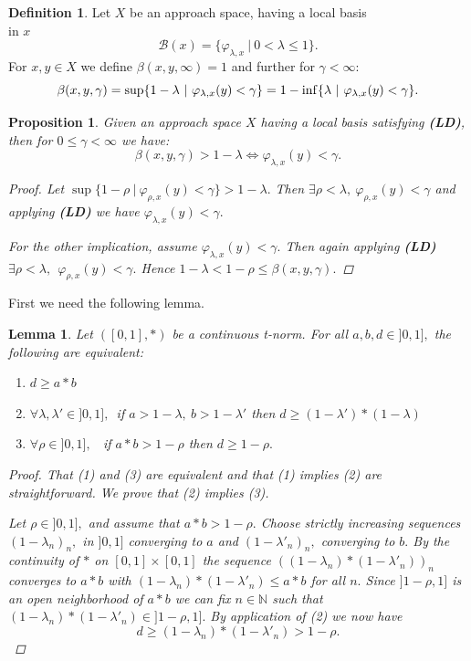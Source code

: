 \documentclass[12pt,a4paper]{amsart}
\theoremstyle{theorem}
\newtheorem{proposition}[theorem]{Proposition}
\newtheorem{lemma}[theorem]{Lemma}
\theoremstyle{definition}
\newtheorem{definition}[theorem]{Definition}
\newcommand{\bbb}{\ensuremath{\mathcal{B}}}
\newcommand{\N}{\ensuremath{\mathbb{N}}}
\renewcommand{\inf}{\myinf}
\DeclareMathOperator*{\myinf}{in\vphantom{p}f}
\renewcommand{\b}{\ensuremath{\beta}}
\renewcommand{\l}{\ensuremath{\lambda}}
\begin{document}
{\begin{definition}\label{}
Let $X$ be an approach space, having a local basis\\
 in $x$
$$
\bbb(x) = \{ \varphi_{\l,x} \ | \ 0  < \l \leq 1 \}.
$$
For $x,y \in X$ we define $\b (x,y, \infty ) = 1$ and further for $\gamma < \infty$:
\begin{equation}\label{beta}
\b(x,y,\gamma) = \sup \{1 - \l \ | \ \varphi_{\l,x} (y) < \gamma\} = 1 - \inf  \{\l \ | \ \varphi_{\l,x} (y) < \gamma\}.
\end{equation}
\end{definition}


\begin{proposition}\label{equivbeta}
Given an approach space $X$ having a local basis satisfying {\bf(LD)},
then for $0 \leq \gamma < \infty$ we have:
$$
\b(x,y,\gamma) > 1 - \l   \Leftrightarrow  \varphi_{\l,x} (y) < \gamma.
$$
\begin{proof}
Let  $\sup \{1 - \rho \ | \ \varphi_{\rho,x} (y) < \gamma\}  > 1 - \l.$ Then $\exists \rho < \l, \ \varphi_{\rho,x}(y) < \gamma$ and applying {\bf(LD)} we have 
$\varphi_{\l,x}(y) < \gamma.$

For the other implication,  assume $\varphi_{\l,x}(y) < \gamma.$ Then again applying {\bf(LD)}\\
 $\exists \rho < \l, 
 \  \ \varphi_{\rho,x}(y) < \gamma.$
Hence $1 - \l < 1 - \rho \leq \b(x,y,\gamma).$
\end{proof}
\end{proposition}

 First we need the following lemma.
\begin{lemma}\label{star}
Let $([0,1], *)$ be a continuous t-norm. For all $a,b,d \in ]0,1],$ the following are equivalent:
\begin{enumerate}
\item $d \geq a * b$
\item $\forall \l,\l' \in ]0,1], $\  if $a > 1-\l, \ b > 1-\l'$ then $d \geq (1-\l') * (1-\l)$
\item $\forall \rho  \in ]0,1],$ \ if $a * b > 1-\rho$ then $d \geq 1-\rho.$
\end{enumerate}
\begin{proof}
That (1) and (3) are equivalent and that (1) implies (2) are straightforward.
We prove that (2) implies (3). 

Let $ \rho  \in ]0,1],$ and assume that $a*b > 1-\rho.$
Choose strictly increasing sequences $(1-\l_n)_n,$ in $]0,1]$ converging to $a$ and $(1-\l'_n)_n,$ converging to $b.$ 
By the continuity of $*$ on $[0,1]\times [0,1]$ the sequence $((1-\l_n) * (1-\l'_n))_n$ converges to $a * b$ with $(1-\l_n) * (1-\l'_n) \leq a*b$ for all $n.$
Since $]1-\rho, 1]$ is an open neighborhood of $a * b$ we can fix $n \in \N$ such that $(1-\l_n) * (1-\l'_n) \in ]1-\rho, 1].$
By application of (2) we now have
$$
d \geq (1-\l_n) * (1-\l'_n) > 1 - \rho.
$$


\end{proof}
\end{lemma}}
\end{document}
